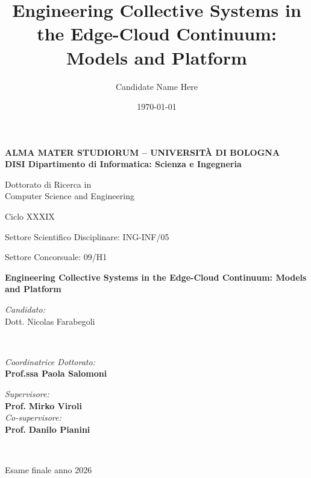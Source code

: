 \title{Engineering Collective Systems in the Edge-Cloud Continuum: Models and Platform}
\author{Candidate Name Here}
\date{\today}

\begin{titlepage}
	\begin{center}

		\large
		\textbf{ALMA MATER STUDIORUM -- UNIVERSITÀ DI BOLOGNA \\ DISI Dipartimento di Informatica: Scienza e Ingegneria}
		\\
		\noindent\hrulefill
		\vspace{0.4cm}

		\Large
		Dottorato di Ricerca in \\
		Computer Science and Engineering

		\vspace{0.4cm}

		Ciclo XXXIX

		\vspace{0.4cm}

		Settore Scientifico Disciplinare: ING-INF/05

		Settore Concorsuale: 09/H1

		\Huge
		\vspace{3cm}
		\textbf{
			Engineering Collective Systems in the Edge-Cloud Continuum: Models and Platform
		}

		{\Large{
		\vspace{3cm}

		\textit{Candidato:\\}
		\centering
		Dott. Nicolas Farabegoli}
		\\}
		\large
		\vspace{2.5cm}
		\begin{minipage}[t]{0.64\textwidth}
			\begin{flushleft}
				\textit{Coordinatrice Dottorato:}
				\\
				\textbf{Prof.ssa Paola Salomoni}
			\end{flushleft}
		\end{minipage}
		\begin{minipage}[t]{0.34\textwidth}
			\begin{flushright}
				\textit{Supervisore:}
				\\
				\textbf{Prof.} \textbf{Mirko Viroli}
				\\
				\vspace{0.4cm}
				\textit{Co-supervisore:}
				\\
				\textbf{Prof.} \textbf{Danilo Pianini}
			\end{flushright}

		\end{minipage}\\

		\vfill
		\noindent\hrulefill
		\vspace{0.3cm}
		\Large

		Esame finale anno 2026
	\end{center}
\end{titlepage}
\restoregeometry
